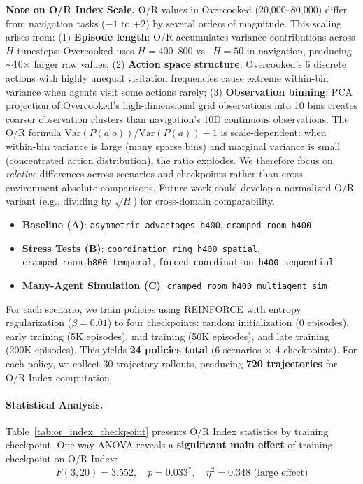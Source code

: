 \textbf{Note on O/R Index Scale.} O/R values in Overcooked (20,000--80,000) differ from navigation tasks ($-1$ to $+2$) by several orders of magnitude. This scaling arises from: (1) \textbf{Episode length}: O/R accumulates variance contributions across $H$ timesteps; Overcooked uses $H=400$--$800$ vs.\ $H=50$ in navigation, producing $\sim$10$\times$ larger raw values; (2) \textbf{Action space structure}: Overcooked's 6 discrete actions with highly unequal visitation frequencies cause extreme within-bin variance when agents visit some actions rarely; (3) \textbf{Observation binning}: PCA projection of Overcooked's high-dimensional grid observations into 10 bins creates coarser observation clusters than navigation's 10D continuous observations. The O/R formula $\text{Var}(P(a|o))/\text{Var}(P(a)) - 1$ is scale-dependent: when within-bin variance is large (many sparse bins) and marginal variance is small (concentrated action distribution), the ratio explodes. We therefore focus on \emph{relative} differences across scenarios and checkpoints rather than cross-environment absolute comparisons. Future work could develop a normalized O/R variant (e.g., dividing by $\sqrt{H}$) for cross-domain comparability.
\begin{itemize}
    \item \textbf{Baseline (A)}: \texttt{asymmetric\_advantages\_h400}, \texttt{cramped\_room\_h400}
    \item \textbf{Stress Tests (B)}: \texttt{coordination\_ring\_h400\_spatial}, \texttt{cramped\_room\_h800\_temporal}, \texttt{forced\_coordination\_h400\_sequential}
    \item \textbf{Many-Agent Simulation (C)}: \texttt{cramped\_room\_h400\_multiagent\_sim}
\end{itemize}

For each scenario, we train policies using REINFORCE with entropy regularization ($\beta=0.01$) to four checkpoints: random initialization (0 episodes), early training (5K episodes), mid training (50K episodes), and late training (200K episodes). This yields \textbf{24 policies total} (6 scenarios $\times$ 4 checkpoints). For each policy, we collect 30 trajectory rollouts, producing \textbf{720 trajectories} for O/R Index computation.

\paragraph{Statistical Analysis.}

Table~\ref{tab:or_index_checkpoint} presents O/R Index statistics by training checkpoint. One-way ANOVA reveals a \textbf{significant main effect} of training checkpoint on O/R Index:
\begin{equation}
F(3, 20) = 3.552, \quad p = 0.033^*, \quad \eta^2 = 0.348 \text{ (large effect)}
\end{equation}

